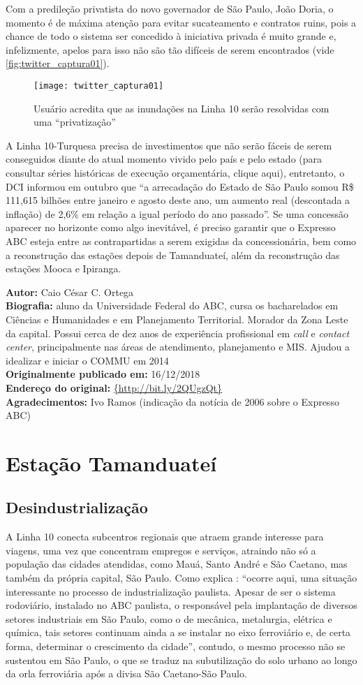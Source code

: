 \documentclass[11pt,fleqn]{book} %
\newcommand{\infocaio}[2]{\textbf{Autor:} Caio C\'{e}sar C. Ortega \\ \textbf{Biografia:} aluno da Universidade Federal do ABC, cursa os bacharelados em Ci\^{e}ncias e Humanidades e em Planejamento Territorial. Morador da Zona Leste da capital. Possui cerca de dez anos de experi\^{e}ncia profissional em \textit{call} e \textit{contact center}, principalmente nas \'{a}reas de atendimento, planejamento e MIS. Ajudou a idealizar e iniciar o COMMU em 2014 \\ \textbf{Originalmente publicado em:} {#1} \\ \textbf{Endere\c{c}o do original:} \url{{#2}}}
\begin{document}
Com a predileção privatista do novo governador de São Paulo, João Doria, o momento é de máxima atenção para evitar sucateamento e contratos ruins, pois a chance de todo o sistema ser concedido à iniciativa privada é muito grande e, infelizmente, apelos para isso não são tão difíceis de serem encontrados (vide \autoref{fig:twitter_captura01}).

\begin{wrapfigure}{l}{0.5\textwidth}
	\centering
	\caption[Tuíte pró-privatização da Linha 10]{Usuário acredita que as inundações na Linha 10 serão resolvidas com uma ``privatização''}
	\texttt{[image: twitter\_captura01]}
	\label{fig:twitter_captura01}
\end{wrapfigure}

A Linha 10-Turquesa precisa de investimentos que não serão fáceis de serem conseguidos diante do atual momento vivido pelo país e pelo estado (para consultar séries históricas de execução orçamentária, clique aqui), entretanto, o DCI informou em outubro que “a arrecadação do Estado de São Paulo somou R\$ 111,615 bilhões entre janeiro e agosto deste ano, um aumento real (descontada a inflação) de 2,6\% em relação a igual período do ano passado”. Se uma concessão aparecer no horizonte como algo inevitável, é preciso garantir que o Expresso ABC esteja entre as contrapartidas a serem exigidas da concessionária, bem como a reconstrução das estações depois de Tamanduateí, além da reconstrução das estações Mooca e Ipiranga.

\begin{info}
	\infocaio{16/12/2018}{http://bit.ly/2QUgzQt}\\
	\textbf{Agradecimentos:} Ivo Ramos (indicação da notícia de 2006 sobre o Expresso ABC)
\end{info}

\section{Estação Tamanduateí}

\subsection{Desindustrialização}

A Linha 10 conecta subcentros regionais que atraem grande interesse para viagens, uma vez que concentram empregos e serviços, atraindo não só a população das cidades atendidas, como Mauá, Santo André e São Caetano, mas também da própria capital, São Paulo\cite[pág. 66]{Ferreira}. Como explica \cite[pág. 115]{Stefani}: ``ocorre aqui, uma situação interessante no processo de industrialização paulista. Apesar de ser o sistema rodoviário, instalado no ABC paulista, o responsável pela implantação de diversos setores industriais em São Paulo, como o de mecânica, metalurgia, elétrica e química, tais setores continuam ainda a se instalar no eixo ferroviário e, de certa forma, determinar o crescimento da cidade'', contudo, o mesmo processo não se sustentou em São Paulo, o que se traduz na subutilização do solo urbano ao longo da orla ferroviária após a divisa São Caetano-São Paulo.
\end{document}
